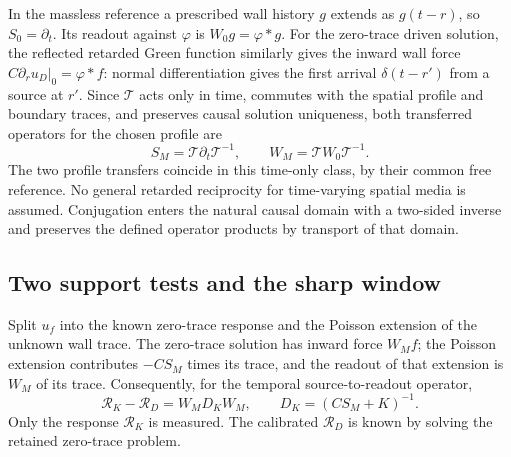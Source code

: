 In the massless reference a prescribed wall history \(g\) extends as \(g(t-r)\), so \(S_0=\partial_t\). Its readout against \(\varphi\) is \(W_0 g=\varphi*g\). For the zero-trace driven solution, the reflected retarded Green function similarly gives the inward wall force \(C\partial_r u_D|_0=\varphi*f\): normal differentiation gives the first arrival \(\delta(t-r')\) from a source at \(r'\). Since \(\mathcal T\) acts only in time, commutes with the spatial profile and boundary traces, and preserves causal solution uniqueness, both transferred operators for the chosen profile are
\begin{equation}
 S_M=\mathcal T\partial_t\mathcal T^{-1},\qquad
 W_M=\mathcal T W_0\mathcal T^{-1}.
 \label{eq:transfer}
\end{equation}
The two profile transfers coincide in this time-only class, by their common free reference. No general retarded reciprocity for time-varying spatial media is assumed. Conjugation enters the natural causal domain with a two-sided inverse and preserves the defined operator products by transport of that domain.

\subsection{Two support tests and the sharp window}
Split \(u_f\) into the known zero-trace response and the Poisson extension of the unknown wall trace. The zero-trace solution has inward force \(W_M f\); the Poisson extension contributes \(-CS_M\) times its trace, and the readout of that extension is \(W_M\) of its trace. Consequently, for the temporal source-to-readout operator,
\begin{equation}
       \mathcal R_K-\mathcal R_D=W_M D_K W_M,\qquad
       D_K=(CS_M+K)^{-1}.
 \label{eq:fac}
\end{equation}
Only the response \(\mathcal R_K\) is measured. The calibrated \(\mathcal R_D\) is known by solving the retained zero-trace problem.

